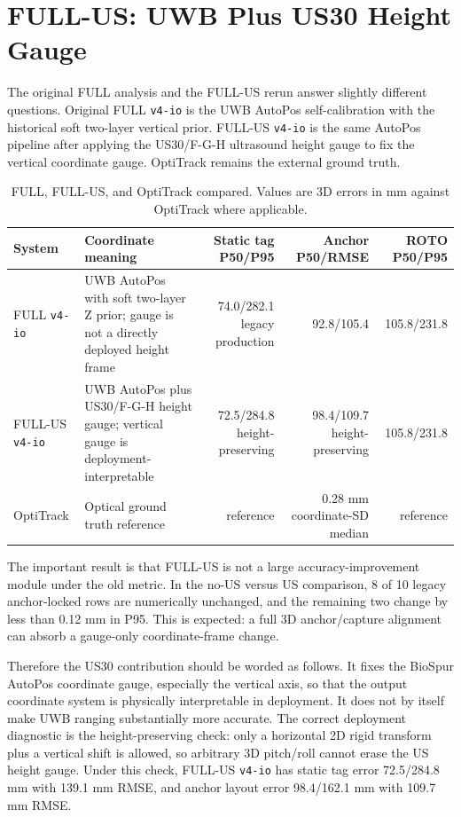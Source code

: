 \documentclass[11pt,a4paper]{article}
\newcommand{\case}[1]{\texttt{#1}}
\newcommand{\tight}{\setlength{\tabcolsep}{4pt}\renewcommand{\arraystretch}{1.12}}
\begin{document}
\section{FULL-US: UWB Plus US30 Height Gauge}

The original FULL analysis and the FULL-US rerun answer slightly different
questions.  Original FULL \case{v4-io} is the UWB AutoPos self-calibration with
the historical soft two-layer vertical prior.  FULL-US \case{v4-io} is the same
AutoPos pipeline after applying the US30/F-G-H ultrasound height gauge to fix
the vertical coordinate gauge.  OptiTrack remains the external ground truth.

\begin{table}[H]
\centering
\tight
\caption{FULL, FULL-US, and OptiTrack compared.  Values are 3D errors in mm
against OptiTrack where applicable.}
\begin{tabularx}{\textwidth}{lXrrr}
\toprule
System & Coordinate meaning & Static tag P50/P95 & Anchor P50/RMSE & ROTO P50/P95 \\
\midrule
FULL \case{v4-io} & UWB AutoPos with soft two-layer Z prior; gauge is not a directly deployed height frame & 74.0/282.1 legacy production & 92.8/105.4 & 105.8/231.8 \\
FULL-US \case{v4-io} & UWB AutoPos plus US30/F-G-H height gauge; vertical gauge is deployment-interpretable & 72.5/284.8 height-preserving & 98.4/109.7 height-preserving & 105.8/231.8 \\
OptiTrack & Optical ground truth reference & reference & 0.28 mm coordinate-SD median & reference \\
\bottomrule
\end{tabularx}
\end{table}

The important result is that FULL-US is not a large accuracy-improvement module
under the old metric.  In the no-US versus US comparison, 8 of 10 legacy
anchor-locked rows are numerically unchanged, and the remaining two change by
less than 0.12 mm in P95.  This is expected: a full 3D anchor/capture alignment
can absorb a gauge-only coordinate-frame change.

Therefore the US30 contribution should be worded as follows.  It fixes the
BioSpur AutoPos coordinate gauge, especially the vertical axis, so that the
output coordinate system is physically interpretable in deployment.  It does not
by itself make UWB ranging substantially more accurate.  The correct deployment
diagnostic is the height-preserving check: only a horizontal 2D rigid transform
plus a vertical shift is allowed, so arbitrary 3D pitch/roll cannot erase the
US height gauge.  Under this check, FULL-US \case{v4-io} has static tag error
72.5/284.8 mm with 139.1 mm RMSE, and anchor layout error 98.4/162.1 mm with
109.7 mm RMSE.
\end{document}
